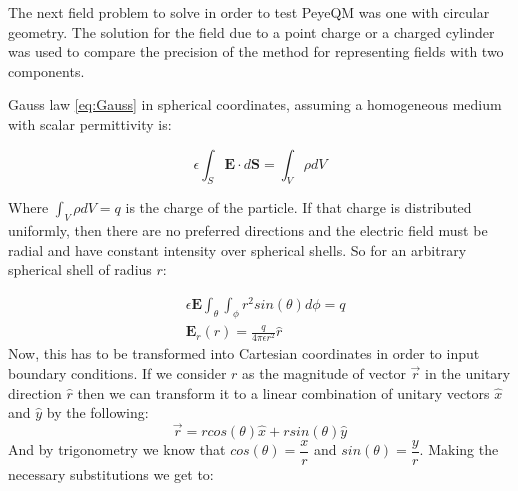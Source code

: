 The next field problem to solve in order to test PeyeQM was one with circular geometry. The solution for the field due to a point charge or a charged cylinder was used to compare the precision of the method for representing fields with two components.

Gauss law \ref{eq:Gauss} in spherical coordinates, assuming a homogeneous medium with scalar permittivity is:

\begin{equation}
\epsilon \int_S \mathbf{E}\cdot d\mathbf{S} = \int_V \rho dV
\end{equation}

Where $\int_V \rho dV = q$ is the charge of the particle. If that charge is distributed uniformly, then there are no preferred directions and the electric field must be radial \cite{Cheng1993} and have constant intensity over spherical shells. So for an arbitrary 
spherical shell of radius $r$:

\begin{align*}
&\epsilon \mathbf{E} \int_{\theta}\int_{\phi} r^2 sin(\theta) d \phi = q \\
& \mathbf{E}_r(r) = \frac{q}{4\pi \epsilon r^2} \hat{r}
\end{align*}
Now, this has to be transformed into Cartesian coordinates in order to input boundary conditions. If we consider $r$ as the magnitude of vector $\vec{r}$ in the unitary direction $\hat{r}$ then we can transform it to a linear combination of unitary vectors $\hat{x}$ and $\hat{y}$ by the following:
\begin{equation}
\vec{r} = r cos(\theta) \hat{x} + r sin(\theta) \hat{y}
\end{equation}
And by trigonometry we know that $cos(\theta) =\dfrac{x}{r}$ and $sin(\theta)=\dfrac{y}{r}$. Making the necessary substitutions we get to:

